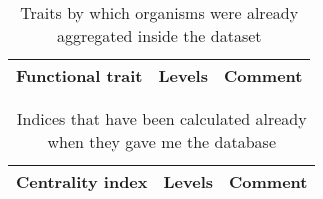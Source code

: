 \documentclass{article}
\begin{document}
	\begin{table}[htbp]
		\begin{center}
			\begin{tabular}{ c c c }
				\hline
				Functional trait & Levels & Comment \\
				\hline
			\end{tabular}
		\end{center}
	\caption{\label{tab:datatraits} Traits by which organisms were already aggregated inside the dataset}
	\end{table}


	\begin{table}[htbp]
		\begin{center}
			\begin{tabular}{ c c c }
				\hline
				Centrality index & Levels & Comment \\
				\hline
			\end{tabular}
		\end{center}
	\caption{\label{tab:dataindices} Indices that have been calculated already when they gave me the database}
	\end{table}


\pagebreak


\end{document}
